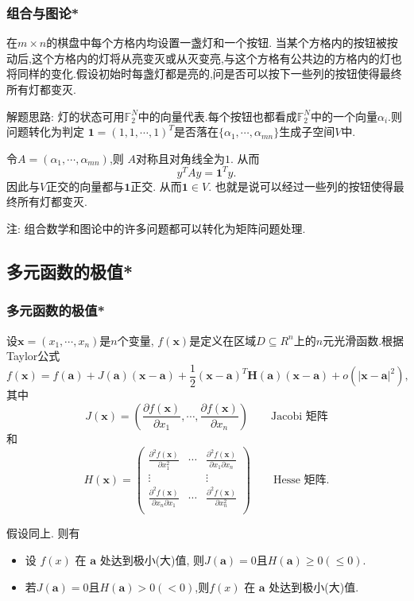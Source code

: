 \begin{frame}\frametitle{组合与图论*}
    \begin{question}[关灯游戏]
    在$m\times n$的棋盘中每个方格内均设置一盏灯和一个按钮. 当某个方格内的按钮被按动后,这个方格内的灯将从亮变灭或从灭变亮,与这个方格有公共边的方格内的灯也将同样的变化.假设初始时每盏灯都是亮的,问是否可以按下一些列的按钮使得最终所有灯都变灭.
    \end{question}
    解题思路: 灯的状态可用$\mathbb F_2^N$中的向量代表.每个按钮也都看成$\mathbb F_2^N$中的一个向量$\alpha_i$.则问题转化为判定
    $\textbf{1}=(1,1,\cdots,1)^T$是否落在$\{\alpha_1,\cdots,\alpha_{mn}\}$生成子空间$V$中.

    令$A=(\alpha_1,\cdots,\alpha_{mn})$,则 $A$对称且对角线全为$1$. 从而
    \[y^TAy =\textbf{1}^Ty.\]
    因此与$V$正交的向量都与$\textbf{1}$正交. 从而$\textbf{1}\in V$. 也就是说可以经过一些列的按钮使得最终所有灯都变灭.

    \bigskip

    注: 组合数学和图论中的许多问题都可以转化为矩阵问题处理.
    \end{frame}





    \subsection{多元函数的极值*}
\begin{frame}\frametitle{多元函数的极值*}
    设$\textbf{x}=(x_1,\cdots,x_n)$是$n$个变量, $f(\textbf{x})$是定义在区域$D\subseteq R^n$上的$n$元光滑函数.根据Taylor公式
    \[f(\textbf{x}) = f(\textbf{a}) +J(\textbf{a})(\textbf{x}-\textbf{a}) + \frac12(\textbf{x}-\textbf{a})^T\textbf{H}(\textbf{a})(\textbf{x}-\textbf{a})+o(|\textbf{x}-\textbf{a}|^2),\]
    其中
    \[J(\textbf{x}) = \left(\frac{\partial f(\textbf{x})}{\partial x_1},\cdots,\frac{\partial f(\textbf{x})}{\partial x_n}\right)\qquad \text{Jacobi 矩阵}\]
    和
    \[H(\textbf{x}) = \begin{pmatrix}
    \frac{\partial^2 f(\textbf{x})}{\partial x^2_1} & \cdots & \frac{\partial^2 f(\textbf{x})}{\partial x_1\partial x_n}\\
    \vdots&&\vdots\\
    \frac{\partial^2 f(\textbf{x})}{\partial x_n\partial x_1} & \cdots & \frac{\partial^2 f(\textbf{x})}{\partial x_n^2}\\
    \end{pmatrix} \qquad \text{Hesse 矩阵}.\]

    \begin{theorem}假设同上. 则有
    \begin{itemize}
    \item 设 $f(x)$ 在 $\textbf{a}$ 处达到极小(大)值, 则$J(\textbf{a}) =0$且$H(\textbf{a})\geq0(\leq0)$.
    \item 若$J(\textbf{a}) =0$且$H(\textbf{a})>0(<0)$,则$f(x)$ 在 $\textbf{a}$ 处达到极小(大)值.
    \end{itemize}
    \end{theorem}
    \end{frame}





